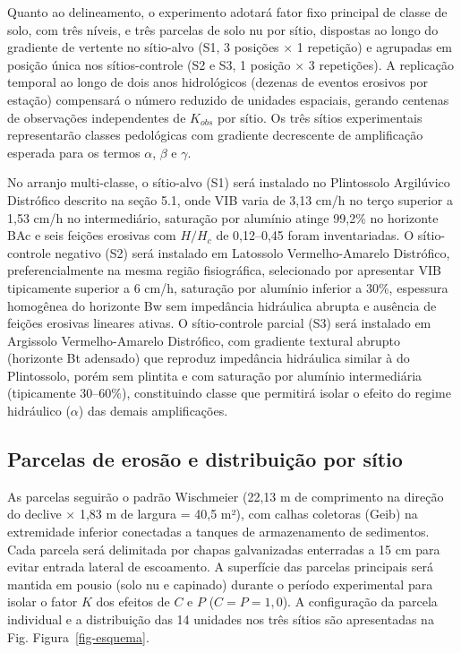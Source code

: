 \documentclass[
  brazilian,
  authoryear,
  preprint]{elsarticle}
\begin{document}
Quanto ao delineamento, o experimento adotará fator fixo principal de
classe de solo, com três níveis, e três parcelas de solo nu por sítio,
dispostas ao longo do gradiente de vertente no sítio-alvo (S1, 3
posições × 1 repetição) e agrupadas em posição única nos sítios-controle
(S2 e S3, 1 posição × 3 repetições). A replicação temporal ao longo de
dois anos hidrológicos (dezenas de eventos erosivos por estação)
compensará o número reduzido de unidades espaciais, gerando centenas de
observações independentes de \(K_{obs}\) por sítio. Os três sítios
experimentais representarão classes pedológicas com gradiente
decrescente de amplificação esperada para os termos \(\alpha\),
\(\beta\) e \(\gamma\).

No arranjo multi-classe, o sítio-alvo (S1) será instalado no Plintossolo
Argilúvico Distrófico descrito na seção 5.1, onde VIB varia de 3,13 cm/h
no terço superior a 1,53 cm/h no intermediário, saturação por alumínio
atinge 99,2\% no horizonte BAc e seis feições erosivas com \(H/H_c\) de
0,12--0,45 foram inventariadas. O sítio-controle negativo (S2) será
instalado em Latossolo Vermelho-Amarelo Distrófico, preferencialmente na
mesma região fisiográfica, selecionado por apresentar VIB tipicamente
superior a 6 cm/h, saturação por alumínio inferior a 30\%, espessura
homogênea do horizonte Bw sem impedância hidráulica abrupta e ausência
de feições erosivas lineares ativas. O sítio-controle parcial (S3) será
instalado em Argissolo Vermelho-Amarelo Distrófico, com gradiente
textural abrupto (horizonte Bt adensado) que reproduz impedância
hidráulica similar à do Plintossolo, porém sem plintita e com saturação
por alumínio intermediária (tipicamente 30--60\%), constituindo classe
que permitirá isolar o efeito do regime hidráulico (\(\alpha\)) das
demais amplificações.

\subsection{Parcelas de erosão e distribuição por
sítio}\label{parcelas-de-erosuxe3o-e-distribuiuxe7uxe3o-por-suxedtio}

As parcelas seguirão o padrão Wischmeier (22,13 m de comprimento na
direção do declive × 1,83 m de largura = 40,5 m²), com calhas coletoras
(Geib) na extremidade inferior conectadas a tanques de armazenamento de
sedimentos. Cada parcela será delimitada por chapas galvanizadas
enterradas a 15 cm para evitar entrada lateral de escoamento. A
superfície das parcelas principais será mantida em pousio (solo nu e
capinado) durante o período experimental para isolar o fator \(K\) dos
efeitos de \(C\) e \(P\) (\(C = P = 1{,}0\)). A configuração da parcela
individual e a distribuição das 14 unidades nos três sítios são
apresentadas na Fig. Figura~\ref{fig-esquema}.
\end{document}
